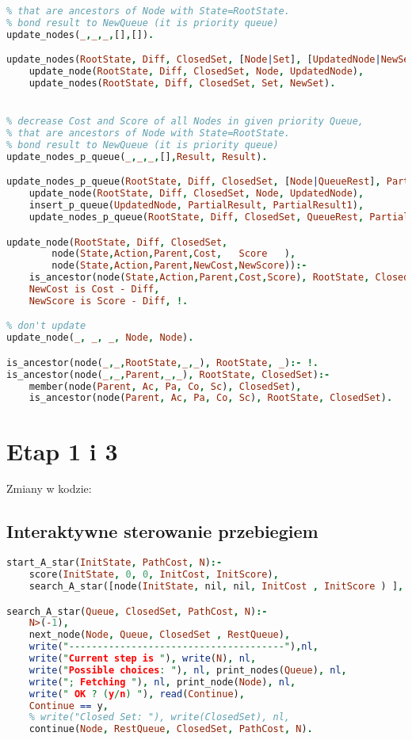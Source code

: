 \documentclass[11pt,a4paper]{article}
\begin{document}
\begin{lstlisting}[language=Prolog]
% decrease Cost and Score of all Nodes in given Queue,
% that are ancestors of Node with State=RootState.
% bond result to NewQueue (it is priority queue)
update_nodes(_,_,_,[],[]).

update_nodes(RootState, Diff, ClosedSet, [Node|Set], [UpdatedNode|NewSet]):-
    update_node(RootState, Diff, ClosedSet, Node, UpdatedNode),
    update_nodes(RootState, Diff, ClosedSet, Set, NewSet).


% decrease Cost and Score of all Nodes in given priority Queue,
% that are ancestors of Node with State=RootState.
% bond result to NewQueue (it is priority queue)
update_nodes_p_queue(_,_,_,[],Result, Result).

update_nodes_p_queue(RootState, Diff, ClosedSet, [Node|QueueRest], PartialResult, Result):-
    update_node(RootState, Diff, ClosedSet, Node, UpdatedNode),
    insert_p_queue(UpdatedNode, PartialResult, PartialResult1),
    update_nodes_p_queue(RootState, Diff, ClosedSet, QueueRest, PartialResult1, Result).

update_node(RootState, Diff, ClosedSet,
        node(State,Action,Parent,Cost,   Score   ),
        node(State,Action,Parent,NewCost,NewScore)):-
    is_ancestor(node(State,Action,Parent,Cost,Score), RootState, ClosedSet),
    NewCost is Cost - Diff,
    NewScore is Score - Diff, !.

% don't update
update_node(_, _, _, Node, Node).

is_ancestor(node(_,_,RootState,_,_), RootState, _):- !.
is_ancestor(node(_,_,Parent,_,_), RootState, ClosedSet):-
    member(node(Parent, Ac, Pa, Co, Sc), ClosedSet),
    is_ancestor(node(Parent, Ac, Pa, Co, Sc), RootState, ClosedSet).
\end{lstlisting}


\section{Etap 1 i 3}\label{sec:general}
Zmiany w kodzie:

\subsection{Interaktywne sterowanie przebiegiem}\label{sec:przeb}
\begin{lstlisting}[language=Prolog]
start_A_star(InitState, PathCost, N):-
    score(InitState, 0, 0, InitCost, InitScore),
    search_A_star([node(InitState, nil, nil, InitCost , InitScore ) ], [ ], PathCost, N).

search_A_star(Queue, ClosedSet, PathCost, N):-
    N>(-1),
    next_node(Node, Queue, ClosedSet , RestQueue),
    write("--------------------------------------"),nl,
    write("Current step is "), write(N), nl,
    write("Possible choices: "), nl, print_nodes(Queue), nl,
    write("; Fetching "), nl, print_node(Node), nl,
    write(" OK ? (y/n) "), read(Continue),
    Continue == y,
    % write("Closed Set: "), write(ClosedSet), nl,
    continue(Node, RestQueue, ClosedSet, PathCost, N).
\end{lstlisting}
\end{document}
